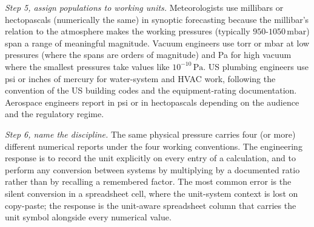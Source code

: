 \begin{exercise}
\textit{Step 5, assign populations to working units.} Meteorologists
use millibars or hectopascals (numerically the same) in synoptic
forecasting because the millibar's relation to the atmosphere makes
the working pressures (typically $950$-$1050 \,\text{mbar}$) span a
range of meaningful magnitude. Vacuum engineers use torr or mbar at
low pressures (where the spans are orders of magnitude) and Pa for
high vacuum where the smallest pressures take values like
$10^{-10} \,\si{\pascal}$. US plumbing engineers use psi or inches of
mercury for water-system and HVAC work, following the convention of
the US building codes and the equipment-rating documentation.
Aerospace engineers report in psi or in hectopascals depending on
the audience and the regulatory regime.

\textit{Step 6, name the discipline.} The same physical pressure
carries four (or more) different numerical reports under the four
working conventions. The engineering response is to record the unit
explicitly on every entry of a calculation, and to perform any
conversion between systems by multiplying by a documented ratio
rather than by recalling a remembered factor. The most common error
is the silent conversion in a spreadsheet cell, where the unit-system
context is lost on copy-paste; the response is the unit-aware
spreadsheet column that carries the unit symbol alongside every
numerical value.
\end{exercise}

